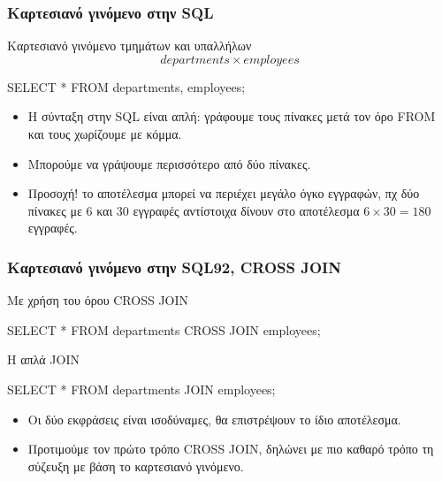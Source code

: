 \begin{frame}
\frametitle{Καρτεσιανό γινόμενο στην {\en SQL}}
\begin{minipage}{\wE}
\begin{exampleblock}{Καρτεσιανό γινόμενο τμημάτων και υπαλλήλων}
\[ departments \times employees \]
\en
\begin{SQL}
  SELECT *
    FROM departments, employees;
\end{SQL}
\el
\end{exampleblock}
\begin{itemize}
  \item Η σύνταξη στην {\sq SQL} είναι απλή: γράφουμε τους πίνακες μετά τον όρο {\sq FROM}
        και τους χωρίζουμε με κόμμα.
  \item Μπορούμε να γράψουμε περισσότερο από δύο πίνακες.
  \item Προσοχή! το αποτέλεσμα μπορεί να περιέχει μεγάλο όγκο εγγραφών,
        πχ δύο πίνακες με 6 και 30 εγγραφές αντίστοιχα δίνουν στο αποτέλεσμα
        $6\times30=180$ εγγραφές.
\end{itemize}
\end{minipage}
\end{frame}



\begin{frame}
\frametitle{Καρτεσιανό γινόμενο στην {\en SQL92, CROSS JOIN}}
\begin{minipage}{\wE}
\pause
\begin{block}{Με χρήση του όρου {\en CROSS JOIN}}
\en
\begin{SQL}
  SELECT *
    FROM departments CROSS JOIN employees;
\end{SQL}
\el
\end{block}
\pause
\begin{block}{Η απλά {\en JOIN}}
\en
\begin{SQL}
  SELECT *
    FROM departments JOIN employees;
\end{SQL}
\el
\end{block}
\pause
\begin{itemize}
  \item Οι δύο εκφράσεις είναι ισοδύναμες, θα επιστρέψουν το ίδιο αποτέλεσμα.
  \item Προτιμούμε τον πρώτο τρόπο {\sq CROSS JOIN}, δηλώνει με πιο καθαρό τρόπο τη σύζευξη
        με βάση το καρτεσιανό γινόμενο.
\end{itemize}
\end{minipage}
\end{frame}



